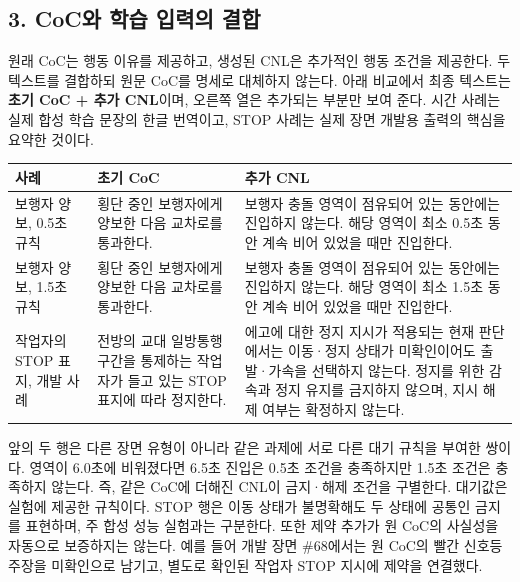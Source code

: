 \documentclass[11pt,a4paper]{article}
\begin{document}
\subsection*{3. CoC와 학습 입력의 결합}

원래 CoC는 행동 이유를 제공하고, 생성된 CNL은 추가적인 행동 조건을 제공한다. 두 텍스트를 결합하되 원문 CoC를 명세로 대체하지 않는다. 아래 비교에서 최종 텍스트는 \textbf{초기 CoC + 추가 CNL}이며, 오른쪽 열은 추가되는 부분만 보여 준다. 시간 사례는 실제 합성 학습 문장의 한글 번역이고, STOP 사례는 실제 장면 개발용 출력의 핵심을 요약한 것이다.\par

\par\medskip\noindent\begin{minipage}{\linewidth}\small
\begin{tabular}{@{}>{\raggedright\arraybackslash}p{}>{\raggedright\arraybackslash}p{}>{\raggedright\arraybackslash}p{}@{}}
\toprule
\textbf{사례} & \textbf{초기 CoC} & \textbf{추가 CNL} \\
\midrule
보행자 양보, 0.5초 규칙 & 횡단 중인 보행자에게 양보한 다음 교차로를 통과한다. & 보행자 충돌 영역이 점유되어 있는 동안에는 진입하지 않는다. 해당 영역이 최소 0.5초 동안 계속 비어 있었을 때만 진입한다. \\
보행자 양보, 1.5초 규칙 & 횡단 중인 보행자에게 양보한 다음 교차로를 통과한다. & 보행자 충돌 영역이 점유되어 있는 동안에는 진입하지 않는다. 해당 영역이 최소 1.5초 동안 계속 비어 있었을 때만 진입한다. \\
작업자의 STOP 표지, 개발 사례 & 전방의 교대 일방통행 구간을 통제하는 작업자가 들고 있는 STOP 표지에 따라 정지한다. & 에고에 대한 정지 지시가 적용되는 현재 판단에서는 이동·정지 상태가 미확인이어도 출발·가속을 선택하지 않는다. 정지를 위한 감속과 정지 유지를 금지하지 않으며, 지시 해제 여부는 확정하지 않는다. \\
\bottomrule\end{tabular}\end{minipage}\par\medskip

앞의 두 행은 다른 장면 유형이 아니라 같은 과제에 서로 다른 대기 규칙을 부여한 쌍이다. 영역이 6.0초에 비워졌다면 6.5초 진입은 0.5초 조건을 충족하지만 1.5초 조건은 충족하지 않는다. 즉, 같은 CoC에 더해진 CNL이 금지·해제 조건을 구별한다. 대기값은 실험에 제공한 규칙이다. STOP 행은 이동 상태가 불명확해도 두 상태에 공통인 금지를 표현하며, 주 합성 성능 실험과는 구분한다. 또한 제약 추가가 원 CoC의 사실성을 자동으로 보증하지는 않는다. 예를 들어 개발 장면 \#68에서는 원 CoC의 빨간 신호등 주장을 미확인으로 남기고, 별도로 확인된 작업자 STOP 지시에 제약을 연결했다.\par
\end{document}
